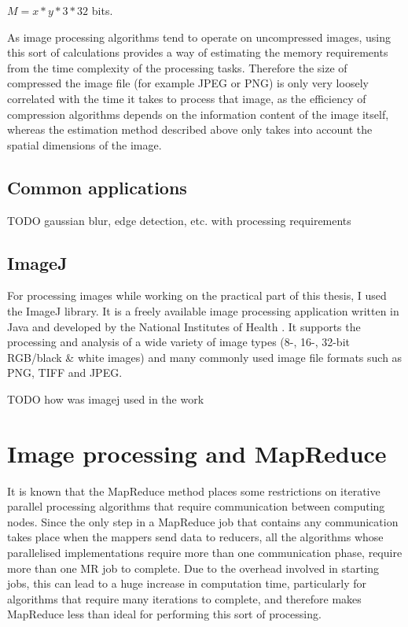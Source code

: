 \documentclass [12pt,a4paper]{report}
\begin{document}
\begin{center} 
$M = x * y * 3 * 32$ bits.
\end{center}

As image processing algorithms tend to operate on uncompressed images, using this sort of calculations provides a way of estimating the memory requirements from the time complexity of the processing tasks. Therefore the size of compressed the image file (for example JPEG or PNG) is only very loosely correlated with the time it takes to process that image, as the efficiency of compression algorithms depends on the information content of the image itself, whereas the estimation method described above only takes into account the spatial dimensions of the image.

\subsection{Common applications}

TODO gaussian blur, edge detection, etc. with processing requirements

\subsection{ImageJ}
For processing images while working on the practical part of this thesis, I used the ImageJ library. It is a freely available image processing application written in Java and developed by the National Institutes of Health \cite{imagej}. It supports the processing and analysis of a wide variety of image types (8-, 16-, 32-bit RGB/black \& white images) and many commonly used image file formats such as PNG, TIFF and JPEG.

TODO how was imagej used in the work

\section{Image processing and MapReduce}

It is known that the MapReduce method places some restrictions on iterative parallel processing algorithms that require communication between computing nodes. Since the only step in a MapReduce job that contains any communication takes place when the mappers send data to reducers, all the algorithms whose parallelised implementations require more than one communication phase, require more than one MR job to complete. Due to the overhead involved in starting jobs, this can lead to a huge increase in computation time, particularly for algorithms that require many iterations to complete, and therefore makes MapReduce less than ideal for performing this sort of processing.
\end{document}
